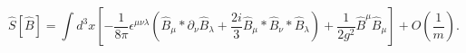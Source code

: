 \begin{equation}
\hat S[\hat B]=\int d^{3}x [-\frac{1}{8\pi}\epsilon^{\mu\nu\lambda}(\hat B_{\mu}*\partial_{\nu}\hat B_{\lambda}+\frac{2i}{3}\hat B_{\mu}*\hat B_{\nu}*\hat B_{\lambda})+\frac{1}{2g^{2}}\hat B^{\mu}\hat B_{\mu}] +O(\frac{1}{m}).
\label{bosz}
\end{equation}

